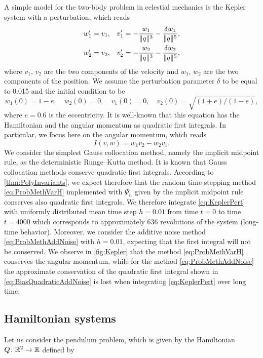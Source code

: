 \documentclass[10pt]{article}
\begin{document}
A simple model for the two-body problem in celestial mechanics is the Kepler system with a perturbation, which reads
\begin{equation}\label{eq:KeplerPert}
\begin{aligned}
	w_1' &= v_1, && v_1' = -\frac{w_1}{\lVert q\rVert^3} - \frac{\delta w_1}{\lVert q\rVert^5}, \\
	w_2' &= v_2, && v_2' = -\frac{w_2}{\lVert q\rVert^3} - \frac{\delta w_2}{\lVert q\rVert^5},
\end{aligned}
\end{equation}
where $v_1$, $v_2$ are the two components of the velocity and $w_1$, $w_2$ are the two components of the position. We assume the perturbation parameter $\delta$ to be equal to 0.015 and the initial condition to be
\begin{equation}
	w_1(0) = 1 - e,\quad w_2(0) = 0, \quad v_1(0) = 0, \quad v_2(0) = \sqrt{(1 + e)/(1 − e)},
\end{equation}
where $e = 0.6$ is the eccentricity. It is well-known that this equation has the Hamiltonian and the angular momentum as quadratic first integrals. In particular, we focus here on the angular momentum, which reads
\begin{equation}
	I(v, w) = w_1v_2 - w_2v_1.
\end{equation}
We consider the simplest Gauss collocation method, namely the implicit midpoint rule, as the deterministic Runge--Kutta method. It is known that Gauss collocation methods conserve quadratic first integrals. According to \cref{thm:PolyInvariants}, we expect therefore that the random time-stepping method \eqref{eq:ProbMethVarH} implemented with $\Psi_h$ given by the implicit midpoint rule conserves also quadratic first integrals. We therefore integrate \eqref{eq:KeplerPert} with uniformly distributed mean time step $h = 0.01$ from time $t = 0$ to time $t = 4000$ which corresponds to approximately $636$ revolutions of the system (long-time behavior). Moreover, we consider the additive noise method \eqref{eq:ProbMethAddNoise} with $h = 0.01$, expecting that the first integral will not be conserved. We observe in \cref{fig:Kepler} that the method \eqref{eq:ProbMethVarH} conserves the angular momentum, while for the method \eqref{eq:ProbMethAddNoise} the approximate conservation of the quadratic first integral shown in \eqref{eq:BiasQuadraticAddNoise} is lost when integrating \eqref{eq:KeplerPert} over long time.

\subsection{Hamiltonian systems} Let us consider the pendulum problem, which is given by the Hamiltonian $Q \colon \mathbb{R}^2 \to \mathbb{R}$ defined by
\end{document}
